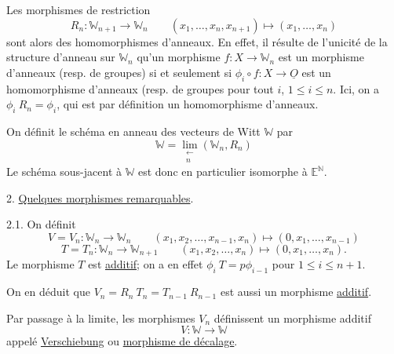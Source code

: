 \documentclass[11pt]{article}
\newcommand{\scanpage}[1]{\par\bigskip\noindent{\small\sffamily[scan #1]}\par}
\newcommand{\mspage}[1]{{\small\sffamily[p.\,#1]}}
\newcommand{\hand}[1]{\textcolor{blue}{#1}}
\newcommand{\uline}[1]{\underline{#1}}
\begin{document}
\mspage{\hand{2}}

\clearpage
\scanpage{129/3}
Les morphismes de restriction
\[ R_n : \mathbb{W}_{n+1} \to \mathbb{W}_n \qquad (x_1,\ldots,x_n,x_{n+1}) \mapsto (x_1,\ldots,x_n) \]
sont alors des homomorphismes d'anneaux. En effet, il résulte de
l'unicité de la structure d'anneau sur $\mathbb{W}_n$ qu'un morphisme $f: X \to \mathbb{W}_n$
est un morphisme d'anneaux (resp. de groupes) si et seulement si
$\phi_i \circ f: X \to \underline{O}$ est un homomorphisme d'anneaux (resp. de groupes pour
tout $i$, $1 \leq i \leq n$. Ici, on a $\phi_i\ R_n = \phi_i$, qui est par définition
un homomorphisme d'anneaux.

On définit le schéma en anneau des vecteurs de Witt $\mathbb{W}$ par
\[ \mathbb{W} = \lim_{\substack{\leftarrow \\ n}} (\mathbb{W}_n,R_n) \]
Le schéma sous-jacent à $\mathbb{W}$ est donc en particulier isomorphe à $\mathbb{E}^{\mathbb{N}}$.

2. \uline{Quelques morphismes remarquables}.

2.1. On définit
\[ V = V_n : \mathbb{W}_n \to \mathbb{W}_n \qquad (x_1,x_2,\ldots,x_{n-1},x_n) \mapsto (0,x_1,\ldots,x_{n-1}) \]
\[ T = T_n : \mathbb{W}_n \to \mathbb{W}_{n+1} \qquad (x_1,x_2,\ldots,x_n) \mapsto (0,x_1,\ldots,x_n). \]
Le morphisme $T$ est \uline{additif}; on a en effet $\phi_i\ T = p\phi_{i-1}$
pour $1 \leq i \leq n+1$.

On en déduit que $V_n = R_n\ T_n = T_{n-1}\ R_{n-1}$ est aussi un morphisme
\uline{additif}.

\mspage{\hand{3}}

\clearpage
\scanpage{129/4}
Par passage à la limite, les morphismes $V_n$ définissent
un morphisme additif
\[ V\colon \mathbb{W} \to \mathbb{W} \]
appelé \uline{Verschiebung} ou \uline{morphisme de décalage}.
\end{document}

